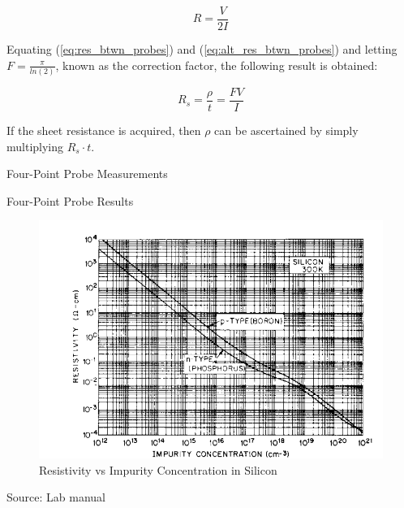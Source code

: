 \documentclass{article}
\begin{document}
\begin{equation}
\label{eq:alt_res_btwn_probes}
R = \frac{V}{2I}
\end{equation}

Equating (\ref{eq:res_btwn_probes}) and (\ref{eq:alt_res_btwn_probes}) and letting $F = \frac{\pi}{ln(2)}$, known as the correction factor, the following result is obtained:

\begin{equation}
\label{eq:sheet_res_vi}
R_s = \frac{\rho}{t} = \frac{ FV }{ I }
\end{equation}

If the sheet resistance is acquired, then $\rho$ can be ascertained by simply multiplying $R_s \cdot t$.


\FloatBarrier

\begin{table}[h!]
	\centering
	\caption{Four-Point Probe Measurements}
	\label{tab:fpp_measure}
\end{table}

\FloatBarrier

\begin{table}[h!]
	\centering
	\caption{Four-Point Probe Results}
	\label{tab:fpp_results}
\end{table}

\FloatBarrier

\FloatBarrier

\begin{figure}[h!]
	\centering
	\includegraphics[scale=0.5]{../images/resistivity_graph.PNG}
	\caption{Resistivity vs Impurity Concentration in Silicon}
	\label{fig:res_vs_imp}
\end{figure}
{\footnotesize Source: Lab manual}
\end{document}
